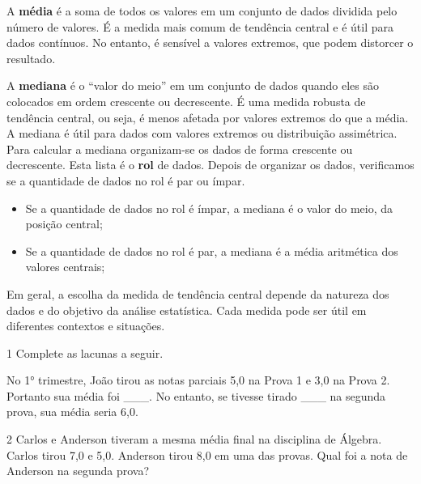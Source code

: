 {{{\begin{escolha}
{{{{{\begin{escolha}
\begin{escolha}
{\begin{q°}
{A \textbf{média} é a soma de todos os valores em um conjunto de dados dividida
pelo número de valores. É a medida mais comum de tendência central e é
útil para dados contínuos. No entanto, é sensível a valores extremos,
que podem distorcer o resultado.

A \textbf{mediana} é o ``valor do meio'' em um conjunto de dados quando eles são
colocados em ordem crescente ou decrescente. É uma medida robusta de
tendência central, ou seja, é menos afetada por valores extremos do que
a média. A mediana é útil para dados com valores extremos ou
distribuição assimétrica. Para calcular a mediana organizam-se os dados
de forma crescente ou decrescente. Esta lista é o \textbf{rol} de dados. 
Depois de organizar os dados, verificamos se a quantidade de dados no rol
é par ou ímpar.

\begin{itemize}
\item
  Se a quantidade de dados no rol é ímpar, a mediana é o valor do meio,
  da posição central;
\item
  Se a quantidade de dados no rol é par, a mediana é a média aritmética
  dos valores centrais;
\end{itemize}

Em geral, a escolha da medida de tendência central depende da natureza
dos dados e do objetivo da análise estatística. Cada medida pode ser
útil em diferentes contextos e situações.
}


\num{1} Complete as lacunas a seguir.

No 1° trimestre, João tirou as notas parciais 5,0 na Prova 1 e 3,0 na
Prova 2. Portanto sua média foi \_\_\_. No entanto, se tivesse tirado
\_\_\_ na segunda prova, sua média seria 6,0.



\num{2} Carlos e Anderson tiveram a mesma média final na disciplina de Álgebra.
Carlos tirou 7,0 e 5,0. Anderson tirou 8,0 em uma das provas. Qual foi a nota 
de Anderson na segunda prova?





\end{q°}}
\end{escolha}
\end{escolha}}}}}}
\end{escolha}}}}
